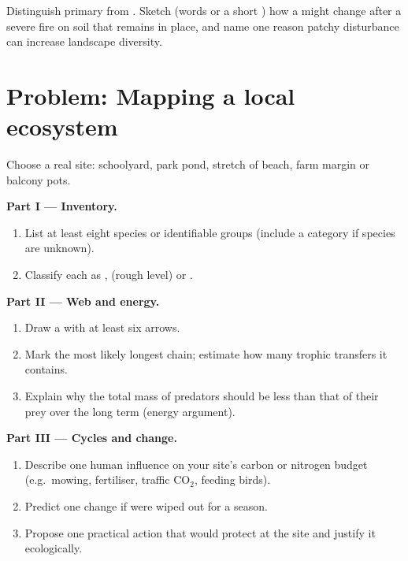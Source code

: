 \begin{exercise}[$\star\star\star$]\label{exo:g10:ecosystems:13}
Distinguish primary from . Sketch (words or a short
) how a  might change after a severe fire on soil that
remains in place, and name one reason patchy disturbance can increase
landscape diversity.
\end{exercise}

\section{Problem: Mapping a local ecosystem}

\begin{problem}
\label{pb:g10:ecosystems:1}
Choose a real site: schoolyard, park pond, stretch of beach, farm margin
or balcony pots.

\medskip
\noindent\textbf{Part I --- Inventory.}
\begin{enumerate}
  \item List at least eight species or identifiable groups (include a
         category if species are unknown).
  \item Classify each as ,  (rough level) or .
\end{enumerate}

\medskip
\noindent\textbf{Part II --- Web and energy.}
\begin{enumerate}
  \item Draw a  with at least six arrows.
  \item Mark the most likely longest chain; estimate how many trophic
        transfers it contains.
  \item Explain why the total mass of predators should be less than that
        of their prey over the long term (energy argument).
\end{enumerate}

\medskip
\noindent\textbf{Part III --- Cycles and change.}
\begin{enumerate}
  \item Describe one human influence on your site's carbon or nitrogen
        budget (e.g.\ mowing, fertiliser, traffic $\mathrm{CO_2}$,
        feeding birds).
  \item Predict one  change if  were wiped out for a
        season.
  \item Propose one practical action that would protect  at
        the site and justify it ecologically.
\end{enumerate}
\end{problem}
